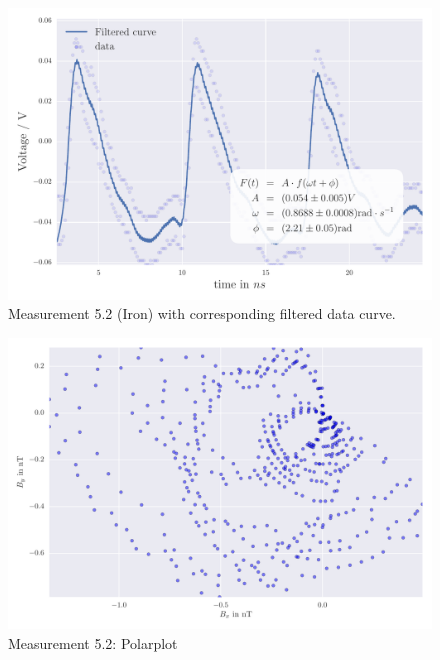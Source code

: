 \begin{figure}[H]
    \centering
    \includegraphics[width=0.7\linewidth]{analysis/figures/fit5_2}
    \caption{Measurement 5.2 (Iron) with corresponding filtered data curve.}
    \label{fig:5_2_plot}
\end{figure}
\begin{figure}[H]
    \centering
    \includegraphics[width=0.7\linewidth]{analysis/figures/polar5_2}
    \caption{Measurement 5.2: Polarplot}
    \label{fig:5_2_polar}
\end{figure}

